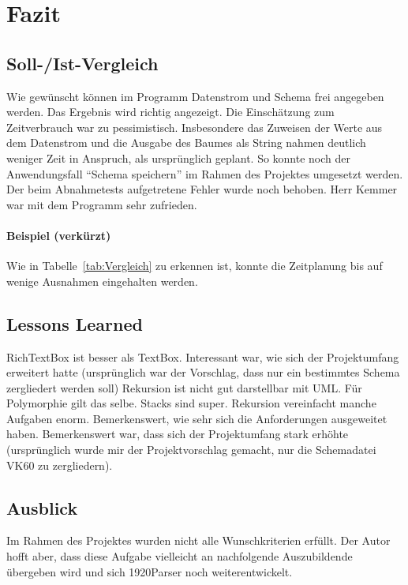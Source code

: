 \section{Fazit} 
\label{sec:Fazit}

\subsection{Soll-/Ist-Vergleich}
\label{sec:SollIstVergleich}
Wie gewünscht können im Programm Datenstrom und Schema frei angegeben werden. Das Ergebnis wird richtig angezeigt.
Die Einschätzung zum Zeitverbrauch war zu pessimistisch. Insbesondere das Zuweisen der Werte aus dem Datenstrom und die Ausgabe des Baumes als String nahmen deutlich weniger Zeit in Anspruch, als ursprünglich geplant. So konnte noch der Anwendungsfall ``Schema speichern'' im Rahmen des Projektes umgesetzt werden.
Der beim Abnahmetests aufgetretene Fehler wurde noch behoben. Herr Kemmer war mit dem Programm sehr zufrieden.


\paragraph{Beispiel (verkürzt)}
Wie in Tabelle~\ref{tab:Vergleich} zu erkennen ist, konnte die Zeitplanung bis auf wenige Ausnahmen eingehalten werden.


\subsection{Lessons Learned}
\label{sec:LessonsLearned}
RichTextBox ist besser als TextBox.
Interessant war, wie sich der Projektumfang erweitert hatte (ursprünglich war der Vorschlag, dass nur ein bestimmtes Schema zergliedert werden soll)
Rekursion ist nicht gut darstellbar mit UML. Für Polymorphie gilt das selbe. Stacks sind super. Rekursion vereinfacht manche Aufgaben enorm. Bemerkenswert, wie sehr sich die Anforderungen ausgeweitet haben.
Bemerkenswert war, dass sich der Projektumfang stark erhöhte (ursprünglich wurde mir der Projektvorschlag gemacht, nur die Schemadatei VK60 zu zergliedern).



\subsection{Ausblick}
\label{sec:Ausblick}
Im Rahmen des Projektes wurden nicht alle Wunschkriterien erfüllt. Der Autor hofft aber, dass diese Aufgabe vielleicht an nachfolgende Auszubildende übergeben wird und sich 1920Parser noch weiterentwickelt.

